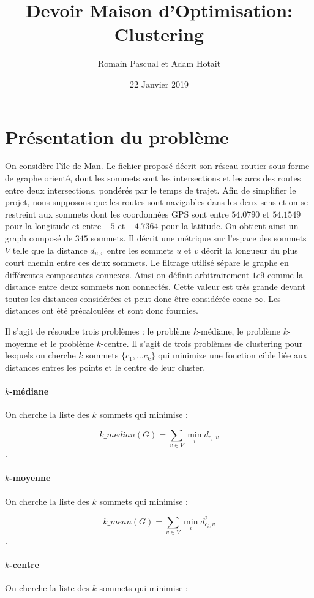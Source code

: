 \documentclass[12pt,a4paper]{article}
\author{Romain Pascual et Adam Hotait}
\date{22 Janvier 2019}
\title{Devoir Maison d'Optimisation: Clustering}
\begin{document}
\maketitle

\section*{Présentation du problème}
On considère l'île de Man. Le fichier proposé décrit son réseau routier sous forme de graphe orienté, dont les sommets sont les intersections et les arcs des routes entre deux intersections, pondérés par le temps de trajet. Afin de simplifier le projet, nous supposons que les routes sont navigables dans les deux sens et on se restreint aux sommets dont les coordonnées GPS sont entre $54.0790$ et $54.1549$ pour la longitude et entre $-5$ et $-4.7364$ pour la latitude. On obtient ainsi un graph composé de $345$ sommets. Il décrit une  métrique sur l'espace des sommets $V$ telle que la distance $d_{u,v}$ entre les sommets $u$ et $v$ décrit la longueur du plus court chemin entre ces deux sommets. Le filtrage utilisé sépare le graphe en différentes composantes connexes. Ainsi on définit arbitrairement $1e9$ comme la distance entre deux sommets non connectés. Cette valeur est très grande devant toutes les distances considérées et peut donc être considérée come $\infty$. Les distances ont été précalculées et sont donc fournies.

Il s'agit de résoudre trois problèmes : le problème $k$-médiane, le problème $k$-moyenne et le problème $k$-centre. Il s'agit de trois problèmes de clustering pour lesquels on cherche $k$ sommets $\{c_1, \dots c_{k}\}$ qui minimize une fonction cible liée aux distances entres les points et le centre de leur cluster.

\paragraph{$k$-médiane} On cherche la liste des $k$ sommets qui minimise :

\[ k\_median(G) = \sum_{v \in V} \min_i d_{c_i,v} \].

\paragraph{$k$-moyenne} On cherche la liste des $k$ sommets qui minimise :

\[ k\_mean(G) = \sum_{v \in V} \min_i d^{2}_{c_i,v} \].

\paragraph{$k$-centre} On cherche la liste des $k$ sommets qui minimise :
\end{document}
